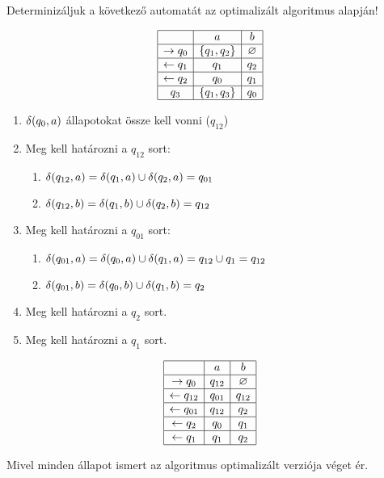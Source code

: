 \begin{example}
	Determinizáljuk a következő automatát az optimalizált algoritmus alapján!
	\begin{table}[H]
		\centering
		$$
		\begin{array}{|c|c|c|}
			\hline
			& a & b \\
			\hline
			\rightarrow q_0 & \left\lbrace q_1, q_2 \right\rbrace & \varnothing \\
			\hline
			\leftarrow q_1 & q_1 &  q_2 \\
			\hline
			\leftarrow q_2 & q_0 & q_1   \\
			\hline
			q_3 & \left\lbrace q_1, q_3 \right\rbrace  & q_0 \\
			\hline
		\end{array}
		$$
	\end{table}
	\begin{enumerate}
		\item $ \operatorname{\delta}(q_0,a) $ állapotokat össze kell vonni ($ q_{12} $)
		
		\item Meg kell határozni a $q_{12}$ sort:
		\begin{enumerate}
			\item $ \operatorname{\delta}(q_{12},a) = \operatorname{\delta}(q_{1},a) \cup \operatorname{\delta}(q_{2},a) = q_{01} $
			\item $ \operatorname{\delta}(q_{12},b) = \operatorname{\delta}(q_{1},b) \cup \operatorname{\delta}(q_{2},b) = q_{12} $
		\end{enumerate}
		
		\item Meg kell határozni a $q_{01}$ sort:
		\begin{enumerate}
			\item $ \operatorname{\delta}(q_{01},a) = \operatorname{\delta}(q_{0},a) \cup \operatorname{\delta}(q_{1},a) = q_{12} \cup q_{1} =  q_{12} $
			\item $ \operatorname{\delta}(q_{01},b) = \operatorname{\delta}(q_{0},b) \cup \operatorname{\delta}(q_{1},b) = q_{2} $
		\end{enumerate}
		
		\item Meg kell határozni a $q_{2}$ sort.
		\item Meg kell határozni a $q_{1}$ sort.
	\end{enumerate}
	\begin{table}[H]
		\centering
		$$
		\begin{array}{|c|c|c|}
			\hline
			& a & b \\
			\hline
			\rightarrow q_0 & q_{12} & \varnothing \\
			\hline
			\leftarrow q_{12} & q_{01} & q_{12}  \\
			\hline
			\leftarrow q_{01} & q_{12} & q_2   \\
			\hline
			\leftarrow q_{2} & q_0 & q_1   \\
			\hline
			\leftarrow q_{1} & q_1 & q_2   \\
			\hline
		\end{array}
		$$
	\end{table}
	Mivel minden állapot ismert az algoritmus optimalizált verziója véget ér.
\end{example}

